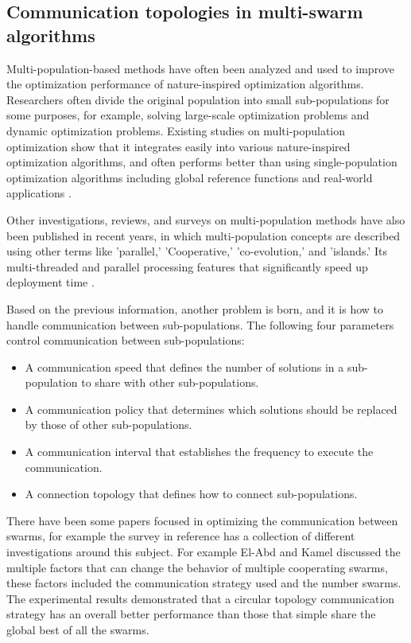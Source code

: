 \documentclass[runningheads]{llncs}
\begin{document}
\subsection{Communication topologies in multi-swarm algorithms}

Multi-population-based methods have often been analyzed and used to improve the
optimization performance of nature-inspired optimization algorithms. Researchers
often divide the original population into small sub-populations for some
purposes, for example, solving large-scale optimization problems and dynamic
optimization problems. Existing studies on multi-population optimization show
that it integrates easily into various nature-inspired optimization algorithms,
and often performs better than using single-population optimization algorithms
including global reference functions and real-world applications \cite{b11} \cite{b12}.

Other investigations, reviews, and surveys on multi-population methods have also been published in recent years, in which multi-population concepts are described using other terms like  'parallel,' 'Cooperative,' 'co-evolution,' and 'islands.' Its multi-threaded and parallel processing features that significantly speed up deployment time \cite{b13}\cite{b14}.

Based on the previous information, another problem is born, and it is how to handle communication between sub-populations. The following four parameters control communication between sub-populations: 
\begin{itemize}
    \item A communication speed that defines the number of solutions in a sub-population to share with other sub-populations.
    \item A communication policy that determines which solutions should be replaced by those of other sub-populations.
    \item A communication interval that establishes the frequency to execute the communication.
    \item A connection topology that defines how to connect sub-populations.

      
\end{itemize}

There have been some papers focused in optimizing the communication
between swarms, for example the survey in reference \cite{b15} has a
collection of different investigations around this subject. For
example El-Abd and Kamel discussed the multiple factors that can
change the behavior of multiple cooperating swarms, these factors
included the communication strategy used and the number swarms. The
experimental results demonstrated that a circular topology
communication strategy has an overall better performance than those
that simple share the global best of all the swarms\cite{b16}. %
\end{document}
